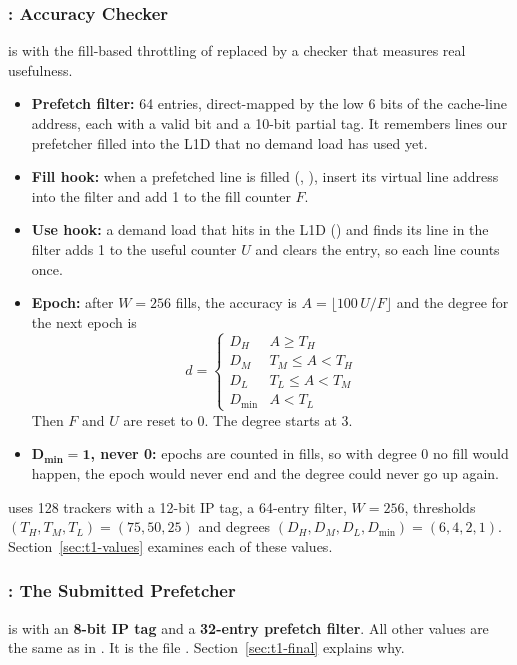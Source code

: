 \subsubsection{: Accuracy Checker}
 is  with the fill-based throttling of  replaced by a checker that measures real usefulness.
\begin{itemize}
  \item \textbf{Prefetch filter:} 64 entries, direct-mapped by the low 6 bits of the cache-line address, each with a
        valid bit and a 10-bit partial tag. It remembers lines our prefetcher filled into the L1D that no demand
        load has used yet.
  \item \textbf{Fill hook:} when a prefetched line is filled (, ),
        insert its virtual line address into the filter and add 1 to the fill counter $F$.
  \item \textbf{Use hook:} a demand load that hits in the L1D () and finds its line in
        the filter adds 1 to the useful counter $U$ and clears the entry, so each line counts once.
  \item \textbf{Epoch:} after $W = 256$ fills, the accuracy is $A = \lfloor 100\,U/F \rfloor$ and the degree for the next epoch is
        \[ d = \begin{cases}
            D_H & A \ge T_H\\
            D_M & T_M \le A < T_H\\
            D_L & T_L \le A < T_M\\
            D_{\min} & A < T_L
          \end{cases} \]
        Then $F$ and $U$ are reset to 0. The degree starts at 3.
  \item $\boldsymbol{D_{\min} = 1}$\textbf{, never 0:} epochs are counted in fills, so with degree 0 no fill would happen,
        the epoch would never end and the degree could never go up again.
\end{itemize}
 uses 128 trackers with a 12-bit IP tag, a 64-entry filter, $W = 256$, thresholds
$(T_H, T_M, T_L) = (75, 50, 25)$ and degrees $(D_H, D_M, D_L, D_{\min}) = (6, 4, 2, 1)$. Section~\ref{sec:t1-values}
examines each of these values.

\subsubsection{: The Submitted Prefetcher}
 is  with an \textbf{8-bit IP tag} and a \textbf{32-entry prefetch filter}. All other values
are the same as in . It is the file . Section~\ref{sec:t1-final} explains why.

